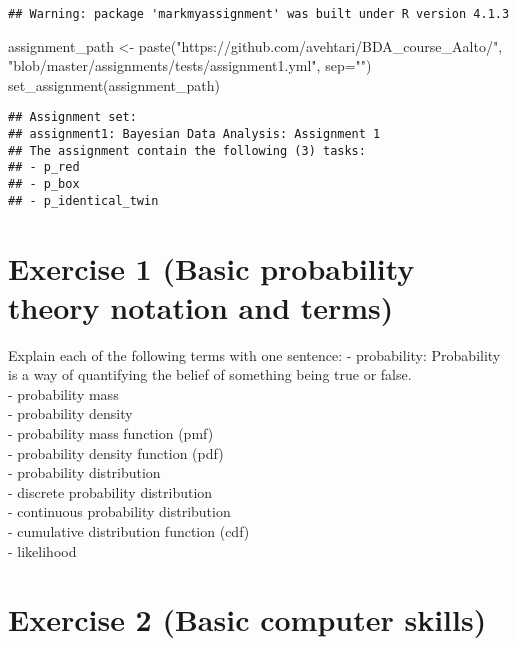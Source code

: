 \documentclass[
]{article}
\newenvironment{Shaded}{\begin{snugshade}}{\end{snugshade}}
\newcommand{\AttributeTok}[1]{\textcolor[rgb]{0.77,0.63,0.00}{#1}}
\newcommand{\FunctionTok}[1]{\textcolor[rgb]{0.00,0.00,0.00}{#1}}
\newcommand{\NormalTok}[1]{#1}
\newcommand{\OtherTok}[1]{\textcolor[rgb]{0.56,0.35,0.01}{#1}}
\newcommand{\StringTok}[1]{\textcolor[rgb]{0.31,0.60,0.02}{#1}}
\begin{document}
\begin{verbatim}
## Warning: package 'markmyassignment' was built under R version 4.1.3
\end{verbatim}

\begin{Shaded}
\begin{Highlighting}[]
\NormalTok{assignment\_path }\OtherTok{\textless{}{-}}
\FunctionTok{paste}\NormalTok{(}\StringTok{"https://github.com/avehtari/BDA\_course\_Aalto/"}\NormalTok{,}
\StringTok{"blob/master/assignments/tests/assignment1.yml"}\NormalTok{, }\AttributeTok{sep=}\StringTok{""}\NormalTok{)}
\FunctionTok{set\_assignment}\NormalTok{(assignment\_path)}
\end{Highlighting}
\end{Shaded}

\begin{verbatim}
## Assignment set:
## assignment1: Bayesian Data Analysis: Assignment 1
## The assignment contain the following (3) tasks:
## - p_red
## - p_box
## - p_identical_twin
\end{verbatim}

\hypertarget{exercise-1-basic-probability-theory-notation-and-terms}{%
\section{Exercise 1 (Basic probability theory notation and
terms)}\label{exercise-1-basic-probability-theory-notation-and-terms}}

Explain each of the following terms with one sentence: - probability:
Probability is a way of quantifying the belief of something being true
or false.\\
- probability mass\\
- probability density\\
- probability mass function (pmf)\\
- probability density function (pdf)\\
- probability distribution\\
- discrete probability distribution\\
- continuous probability distribution\\
- cumulative distribution function (cdf)\\
- likelihood\\

\hypertarget{exercise-2-basic-computer-skills}{%
\section{Exercise 2 (Basic computer
skills)}\label{exercise-2-basic-computer-skills}}
\end{document}
